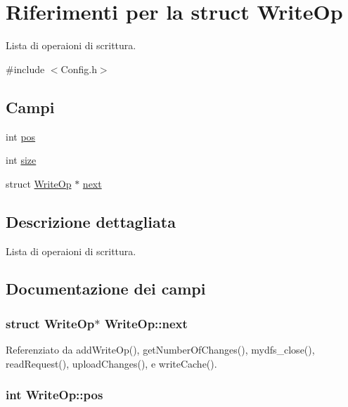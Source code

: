 \hypertarget{structWriteOp}{}\section{Riferimenti per la struct Write\+Op}
\label{structWriteOp}


Lista di operaioni di scrittura.  




{\ttfamily \#include $<$Config.\+h$>$}

\subsection*{Campi}
\begin{DoxyCompactItemize}
\item 
int \hyperlink{structWriteOp_a0cd1c3d781c93b6feaaa5d01606fdc3d}{pos}
\item 
int \hyperlink{structWriteOp_af804d8a1e3d428ee7275b5e4f467d23a}{size}
\item 
struct \hyperlink{structWriteOp}{Write\+Op} $\ast$ \hyperlink{structWriteOp_ab10157ced397c43b41d1e77a6372a43c}{next}
\end{DoxyCompactItemize}


\subsection{Descrizione dettagliata}
Lista di operaioni di scrittura. 

\subsection{Documentazione dei campi}
\subsubsection[{\texorpdfstring{next}{next}}]{\setlength{\rightskip}{0pt plus 5cm}struct {\bf Write\+Op}$\ast$ Write\+Op\+::next}\hypertarget{structWriteOp_ab10157ced397c43b41d1e77a6372a43c}{}\label{structWriteOp_ab10157ced397c43b41d1e77a6372a43c}


Referenziato da add\+Write\+Op(), get\+Number\+Of\+Changes(), mydfs\+\_\+close(), read\+Request(), upload\+Changes(), e write\+Cache().

\subsubsection[{\texorpdfstring{pos}{pos}}]{\setlength{\rightskip}{0pt plus 5cm}int Write\+Op\+::pos}\hypertarget{structWriteOp_a0cd1c3d781c93b6feaaa5d01606fdc3d}{}\label{structWriteOp_a0cd1c3d781c93b6feaaa5d01606fdc3d}


